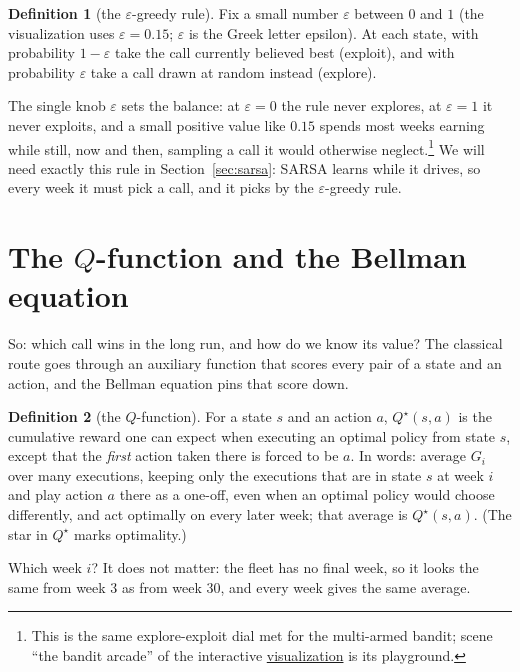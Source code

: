 \documentclass[11pt,a4paper]{article}
\theoremstyle{definition}
\newtheorem{definition}{Definition}[section]
\theoremstyle{remark}
\numberwithin{equation}{section}
\newcommand{\vizhref}[1]{\href{https://eth-ainit-fs26.github.io/rl-arcade/repair-or-replace/}{#1}}
\begin{document}
\begin{definition}[the $\varepsilon$-greedy rule]\label{def:epsilon}
Fix a small number $\varepsilon$ between $0$ and $1$ (the visualization uses
$\varepsilon = 0.15$; $\varepsilon$ is the Greek letter epsilon). At each state, with
probability $1 - \varepsilon$ take the call currently believed best (exploit), and with
probability $\varepsilon$ take a call drawn at random instead (explore).
\end{definition}

The single knob $\varepsilon$ sets the balance: at $\varepsilon = 0$ the rule never explores,
at $\varepsilon = 1$ it never exploits, and a small positive value like $0.15$ spends most
weeks earning while still, now and then, sampling a call it would otherwise neglect.\footnote{%
This is the same explore-exploit dial met for the multi-armed bandit; scene ``the bandit
arcade'' of the interactive \vizhref{visualization} is its playground.} We will need exactly
this rule in Section~\ref{sec:sarsa}: SARSA learns while it drives, so every week it must pick a
call, and it picks by the $\varepsilon$-greedy rule.

\section{The \texorpdfstring{$Q$}{Q}-function and the Bellman equation}\label{sec:qfunction}

So: which call wins in the long run, and how do we know its value? The classical route goes
through an auxiliary function that scores every pair of a state and an action, and the
Bellman equation pins that score down.

\begin{definition}[the $Q$-function]
For a state $s$ and an action $a$, $Q^\star(s, a)$ is the cumulative reward one can expect
when executing an optimal policy from state $s$, except that the \emph{first} action taken
there is forced to be $a$. In words: average $G_i$ over many executions, keeping only the
executions that are in state $s$ at week $i$ and play action $a$ there as a one-off, even when
an optimal policy would choose differently, and act optimally on every later week; that
average is $Q^\star(s, a)$. (The star in $Q^\star$ marks optimality.)
\end{definition}

Which week $i$? It does not matter: the fleet has no final week, so it looks the same from
week $3$ as from week $30$, and every week gives the same average.
\end{document}
